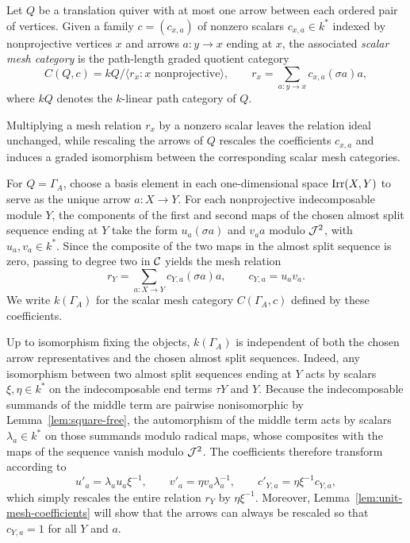 \begin{definition}
\label{def:scalar-mesh-category}
Let $Q$ be a translation quiver with at most one arrow between each ordered
pair of vertices. Given a family $c=(c_{x,a})$ of nonzero scalars
$c_{x,a}\in k^*$ indexed by nonprojective vertices $x$ and arrows $a:y\to x$
ending at $x$, the associated \emph{scalar mesh category} is the path-length
graded quotient category
\[
 C(Q,c)=kQ/\langle r_x:x\text{ nonprojective}\rangle,
 \qquad r_x=\sum_{a:y\to x}c_{x,a}(\sigma a)a,
\]
where $kQ$ denotes the $k$-linear path category of $Q$.
\end{definition}

Multiplying a mesh relation $r_x$ by a nonzero scalar leaves the relation
ideal unchanged, while rescaling the arrows of $Q$ rescales the coefficients
$c_{x,a}$ and induces a graded isomorphism between the corresponding scalar
mesh categories.

For $Q=\Gamma_A$, choose a basis element in each one-dimensional space
$\operatorname{Irr}(X,Y)$ to serve as the unique arrow $a:X\to Y$. For each nonprojective
indecomposable module $Y$, the components of the first and second maps of
the chosen almost split sequence ending at $Y$ take the form
$u_a(\sigma a)$ and $v_a a$ modulo $\mathcal J^2$, with $u_a,v_a\in k^*$. Since the
composite of the two maps in the almost split sequence is zero, passing to
degree two in $\mathcal C$ yields the mesh relation
\begin{equation}
 r_Y=\sum_{a:X\to Y}c_{Y,a}(\sigma a)a,
 \qquad c_{Y,a}=u_av_a.
 \label{eq:scalar-mesh}
\end{equation}
We write $k(\Gamma_A)$ for the scalar mesh category $C(\Gamma_A,c)$ defined
by these coefficients.

Up to isomorphism fixing the objects, $k(\Gamma_A)$ is independent of both
the chosen arrow representatives and the chosen almost split sequences.
Indeed, any isomorphism between two almost split sequences ending at $Y$ acts
by scalars $\xi,\eta\in k^*$ on the indecomposable end terms $\tau Y$ and
$Y$. Because the indecomposable summands of the middle term are pairwise
nonisomorphic by Lemma~\ref{lem:square-free}, the automorphism of the middle
term acts by scalars $\lambda_a\in k^*$ on those summands modulo radical
maps, whose composites with the maps of the sequence vanish modulo $\mathcal J^2$.
The coefficients therefore transform according to
\[
 u'_a=\lambda_a u_a\xi^{-1},\qquad
 v'_a=\eta v_a\lambda_a^{-1},\qquad
 c'_{Y,a}=\eta\xi^{-1}c_{Y,a},
\]
which simply rescales the entire relation $r_Y$ by $\eta\xi^{-1}$. Moreover,
Lemma~\ref{lem:unit-mesh-coefficients} will show that the arrows can always
be rescaled so that $c_{Y,a}=1$ for all $Y$ and $a$.

